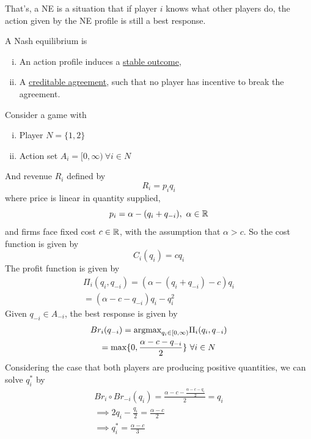\documentclass[11pt]{article}
\begin{document}
		\begin{remark}
			That's, a NE is a situation that if player $i$ knows what other players do, the action given by the NE profile is still a best response.
		\end{remark}
		
		\begin{remark}[Interpretations]
			A Nash equilibrium is 
			\begin{enumerate}[i)]
				\item An action profile induces a \ul{stable outcome},
				\item A \ul{creditable agreement}, such that no player has incentive to break the agreement.
			\end{enumerate}
		\end{remark}
		
		\begin{example}
			Consider a game with
			\begin{enumerate}[i)]
				\item Player $N = \{1,2\}$
				\item Action set $A_i = [0, \infty)\ \forall i \in N$
			\end{enumerate}
			And revenue $R_i$ defined by 
			\begin{equation}
				R_i = p_i q_i
			\end{equation}
			where price is linear in quantity supplied,
			\begin{equation}
				p_i = \alpha - (q_i + q_{-i}),\ \alpha \in \mathbb{R}
			\end{equation}
			and firms face fixed cost $c \in \mathbb{R}$, with the assumption that $\alpha > c$. So the cost function is given by
			\begin{equation}
				C_i(q_i) = c q_i 
			\end{equation}
			The profit function is given by
			\begin{gather}
				\Pi_i(q_i, q_{-i}) = (\alpha - (q_i + q_{-i}) - c) q_i \\
				= (\alpha-c-q_{-i})q_i - q_i^2
			\end{gather}
			Given $q_{-i} \in A_{-i}$, the best response is given by
			\begin{gather}
				Br_i(q_{-i}) = \text{{argmax}}_{q_i \in [0, \infty)} \Pi_i(q_i, q_{-i}) \\
				= \max\{0, \frac{\alpha - c - q_{-i}}{2}\}\ \forall i \in N
			\end{gather}
			Considering the case that both players are producing positive quantities, we can solve $q_i^*$ by
			\begin{gather}
				Br_i \circ Br_{-i}(q_i) = \frac{\alpha - c - \frac{\alpha - c - q_i}{2}}{2} = q_i \\
				\implies 2 q_i - \frac{q_i}{2} = \frac{\alpha - c}{2} \\
				\implies q_i^* = \frac{\alpha - c}{3}
			\end{gather}
			

\end{example}
\end{document}
